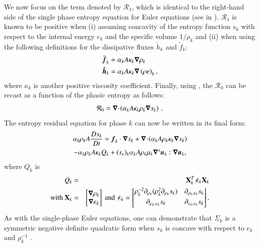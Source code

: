 We now focus on the term denoted by $\mathcal{R}_1$, which is identical to the right-hand side of the single phase entropy 
equation for Euler equations (see  in \cite{Marco_paper_low_mach}). $\mathcal{R}_1$ is known to be positive when 
(i) assuming concavity of the entropy function $s_k$ with respect to the internal energy $e_k$ and the specific 
volume $1 / \rho_k$ and (ii) when using the following definitions for the dissipative fluxes $\tilde{h}_k$ and $\tilde{f}_k$:
%
\begin{subequations} \label{eq:def_visc}
\begin{align}
&\tilde{\boldsymbol f}_k = \alpha_k A \kappa_k \boldsymbol\nabla \rho_k \\
&\tilde{\boldsymbol h}_k = \alpha_k A \kappa_k \boldsymbol\nabla \left( \rho e \right)_k,
\end{align}
\end{subequations}
%  
where $\kappa_k$ is another positive viscosity coefficient. 
%
Finally, using , the $\mathcal{R}_0$ can be recast as a function of the phasic entropy as follows: 
%
\begin{equation}
\mathcal{R}_0 = \boldsymbol\nabla\! \cdot \! \left( \alpha_k A \kappa_k \rho_k \boldsymbol\nabla s_k \right) \,.
\end{equation}
%
The entropy residual equation for phase $k$ can now be written in its final form:
%
\begin{multline}\label{eq:ent-res-7-eqn-diss-terms3}
\alpha_k \rho_k A \frac{Ds_k}{Dt} =  \boldsymbol f_k \cdot \boldsymbol\nabla s_k + \boldsymbol\nabla\! \cdot \! \left( \alpha_k A \rho_k \kappa_k  \boldsymbol\nabla s_k \right)  \\
- \alpha_k \rho_k A \kappa_k Q_k + (s_e)_k \alpha_k A \rho_k \mu_k \boldsymbol\nabla^s \boldsymbol u_k : \boldsymbol\nabla \boldsymbol u_k,
\end{multline}
%
where $Q_k$ is 
%
\begin{eqnarray}
Q_k &=& \mathbf{X}^T_k \mathbb{\Sigma}_k \mathbf{X}_k \nonumber \\
\text{with } \mathbf{X}_k &=& \begin{bmatrix}
\boldsymbol\nabla \rho_k \\
\boldsymbol\nabla e_k 
\end{bmatrix}
\text{ and } \mathbb{\Sigma}_k = \begin{bmatrix}
       \rho_k^{-2} \partial_{\rho_k} (\rho^2_k \partial_{\rho_k} s_k) & \partial_{\rho_k,e_k} s_k  \\[0.3em]
       \partial_{\rho_k,e_k} s_k & \partial_{e_k,e_k} s_k           \\[0.3em]
     \end{bmatrix}. \nonumber 
\end{eqnarray}
%
As with the single-phase Euler equations, one can demonstrate that $\mathbb{\Sigma}_k$ is a symmetric negative definite quadratic form 
when $s_k$ is concave with respect to $e_k$ and $\rho_k^{-1}$  \cite{jlg_VR_SIAM_2004,Marco_paper_low_mach}.

